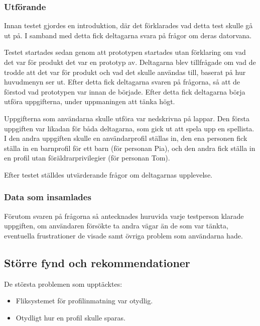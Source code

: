 \documentclass[a4paper,12pt,titlepage]{article}
\begin{document}
\subsubsection*{Utförande}

Innan testet gjordes en introduktion, där det förklarades vad detta test skulle
gå ut på. I samband med detta fick deltagarna svara på frågor om deras
datorvana.

Testet startades sedan genom att prototypen startades utan förklaring om vad
det var för produkt det var en prototyp av. Deltagarna blev tillfrågade om vad
de trodde att det var för produkt och vad det skulle användas till,
baserat på hur huvudmenyn ser ut. Efter detta fick deltagarna svaren på
frågorna, så att de förstod vad prototypen var innan de började. Efter detta
fick deltagarna börja utföra uppgifterna, under uppmaningen att tänka högt.

Uppgifterna som användarna skulle utföra var nedskrivna på lappar. Den första
uppgiften var likadan för båda deltagarna, som gick ut att spela upp en
spellista. I den andra uppgiften skulle en användarprofil ställas in, den ena
personen fick ställa in en barnprofil för ett barn (för personan Pia), och den
andra fick ställa in en profil utan föräldrarprivilegier (för personan Tom).

Efter testet ställdes utvärderande frågor om deltagarnas upplevelse.

\subsubsection*{Data som insamlades}

Förutom svaren på frågorna så antecknades huruvida varje testperson klarade
uppgiften, om användaren försökte ta andra vägar än de som var tänkta,
eventuella frustrationer de visade samt övriga problem som användarna hade.

\subsection*{Större fynd och rekommendationer}

De största problemen som upptäcktes:

\begin{itemize}
    \item Fliksystemet för profilinmatning var otydlig.
    \item Otydligt hur en profil skulle sparas.
\end{itemize}
\end{document}
